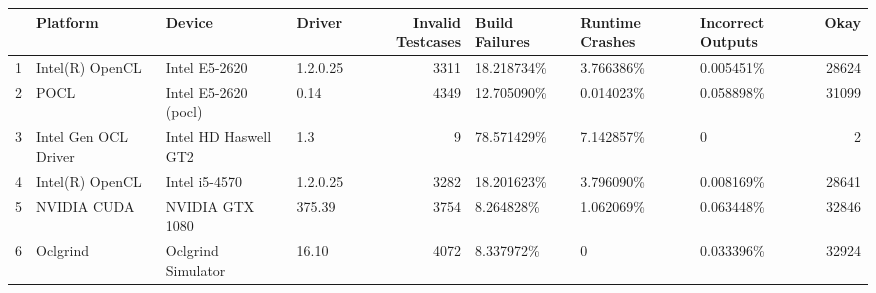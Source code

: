 \begin{tabular}{llllrlllr}
\toprule
{} &              Platform &                Device &    Driver &  Invalid Testcases & Build Failures & Runtime Crashes & Incorrect Outputs &   Okay \\
\midrule
1 &       Intel(R) OpenCL &         Intel E5-2620 &  1.2.0.25 &               3311 &     18.218734\% &       3.766386\% &         0.005451\% &  28624 \\
2 &                  POCL &  Intel E5-2620 (pocl) &      0.14 &               4349 &     12.705090\% &       0.014023\% &         0.058898\% &  31099 \\
3 &  Intel Gen OCL Driver &  Intel HD Haswell GT2 &       1.3 &                  9 &     78.571429\% &       7.142857\% &                 0 &      2 \\
4 &       Intel(R) OpenCL &         Intel i5-4570 &  1.2.0.25 &               3282 &     18.201623\% &       3.796090\% &         0.008169\% &  28641 \\
5 &           NVIDIA CUDA &       NVIDIA GTX 1080 &    375.39 &               3754 &      8.264828\% &       1.062069\% &         0.063448\% &  32846 \\
6 &              Oclgrind &    Oclgrind Simulator &     16.10 &               4072 &      8.337972\% &               0 &         0.033396\% &  32924 \\
\bottomrule
\end{tabular}
